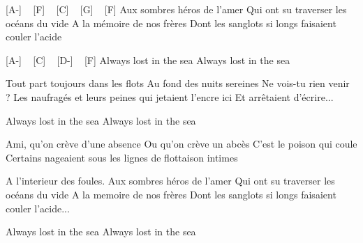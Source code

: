 
[A-] ~ [F] ~ [C] ~ [G] ~ [F]
Aux sombres héros de l'amer
Qui ont su traverser les océans du vide
A la mémoire de nos frères
Dont les sanglots si longs faisaient couler l'acide

[A-] ~ [C] ~ [D-] ~ [F]
Always lost in the sea
Always lost in the sea

Tout part toujours dans les flots
Au fond des nuits sereines
Ne vois-tu rien venir ?
Les naufragés et leurs peines qui jetaient l'encre ici
Et arrêtaient d'écrire...

Always lost in the sea
Always lost in the sea

Ami, qu'on crève d'une absence
Ou qu'on crève un abcès
C'est le poison qui coule
Certains nageaient sous les lignes de flottaison intimes

A l'interieur des foules.
Aux sombres héros de l'amer
Qui ont su traverser les océans du vide
A la memoire de nos frères
Dont les sanglots si longs faisaient couler l'acide...

Always lost in the sea
Always lost in the sea 